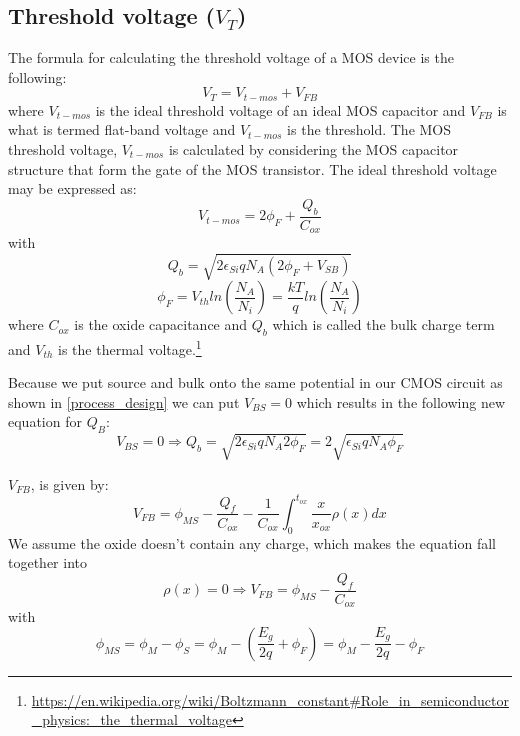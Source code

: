 \subsection{Threshold voltage ($V_T$)}\label{transistor_threshold_calculation}
The formula for calculating the threshold voltage of a MOS device is the following:
\begin{equation}
V_T = V_{t-mos} + V_{FB}
\end{equation}
where $V_{t-mos}$ is the ideal threshold voltage of an ideal MOS capacitor and $V_{FB}$ is what is termed flat-band voltage and $V_{t-mos}$ is the threshold.
The MOS threshold voltage, $V_{t-mos}$ is calculated by considering the MOS capacitor structure that form the gate of the MOS transistor.
The ideal threshold voltage may be expressed as:
\begin{equation}
V_{t-mos}=2 \phi_F + \frac{Q_b}{C_{ox}}
\end{equation}
with
\begin{equation}
Q_b
=
\sqrt{2 \epsilon_{Si} q N_A ( 2 \phi_F + V_{SB}) }
\end{equation}
\begin{equation}
\phi_F
=
V_{th} ln\left(\frac{N_A}{N_i}\right)
=
\frac{k T}{q} ln\left(\frac{N_A}{N_i}\right)
\end{equation}
where $C_{ox}$ is the oxide capacitance and $Q_b$ which is called the bulk charge term and $V_{th}$ is the thermal voltage.\footnote{\url{https://en.wikipedia.org/wiki/Boltzmann_constant\#Role_in_semiconductor_physics:_the_thermal_voltage}}

Because we put source and bulk onto the same potential in our CMOS circuit as shown in \autoref{process_design} we can put $V_{BS}=0$ which results in the following new equation for $Q_B$:
\begin{equation}
V_{BS}=0
\Rightarrow
Q_b
=
\sqrt{2 \epsilon_{Si} q N_A 2 \phi_F }
=
2 \sqrt{\epsilon_{Si} q N_A \phi_F }
\end{equation}

 $V_{FB}$, is given by:
\begin{equation}
V_{FB}
=
\phi_{MS}-\frac{Q_f}{C_{ox}}-\frac{1}{C_{ox}}\int_{0}^{t_{ox}}\frac{x}{x_{ox}}\rho(x) dx
\end{equation}
We assume the oxide doesn't contain any charge, which makes the equation fall together into
\begin{equation}
\rho(x)=0
\Rightarrow
V_{FB}
=
\phi_{MS}-\frac{Q_f}{C_{ox}}
\end{equation}
with
\begin{equation}
\phi_{MS}
=
\phi_{M} - \phi_{S}
=
\phi_{M} -  \left( \frac{E_g}{2 q} + \phi_F \right)
=
\phi_{M} - \frac{E_g}{2 q} - \phi_F
\end{equation}


